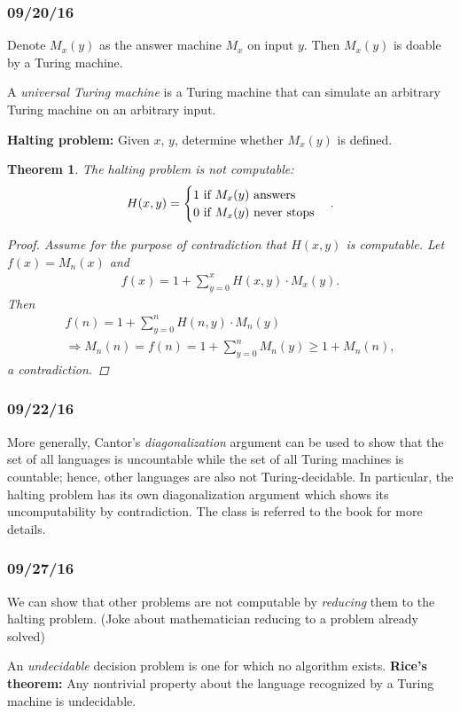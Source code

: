 \documentclass[a4paper,12pt]{article}
\newtheorem{theorem}{Theorem}
\theoremstyle{remark}
\theoremstyle{definition}
\begin{document}
\subsubsection*{09/20/16}
Denote $M_x(y)$ as the answer machine $M_x$ on input $y$. Then $M_x(y)$ is doable by a Turing machine. \par
A \emph{universal Turing machine} is a Turing machine that can simulate an arbitrary Turing machine on an arbitrary input. \par
\textbf{Halting problem:} Given $x$, $y$, determine whether $M_x(y)$ is defined.
\begin{theorem}
    The halting problem is not computable:
    \begin{align*}
        H(x, y) = \begin{cases}
            1 \textnormal{ if } M_x(y) \textnormal{ answers} \\
            0 \textnormal{ if } M_x(y) \textnormal{ never stops}
        \end{cases}.
    \end{align*}
    \begin{proof}
        Assume for the purpose of contradiction that $H(x, y)$ is computable. Let $f(x) = M_n(x)$ and
        \begin{align*}
            f(x) = 1 + \sum_{y = 0}^x H(x, y) \cdot M_x(y).
        \end{align*}
        Then
        \begin{gather*}
            f(n) = 1 + \sum_{y = 0}^n H(n, y) \cdot M_n(y) \\
            \Rightarrow M_n(n) = f(n) = 1 + \sum_{y = 0}^n M_n(y) \geq 1 + M_n(n),
        \end{gather*}
        a contradiction.
    \end{proof}
\end{theorem}
\subsubsection*{09/22/16}
More generally, Cantor's \emph{diagonalization} argument can be used to show that the set of all languages is uncountable while the set of all Turing machines is countable; hence, other languages are also not Turing-decidable. In particular, the halting problem has its own diagonalization argument which shows its uncomputability by contradiction. The class is referred to the book for more details.
\subsubsection*{09/27/16}
We can show that other problems are not computable by \emph{reducing} them to the halting problem. (Joke about mathematician reducing to a problem already solved) \par
An \emph{undecidable} decision problem is one for which no algorithm exists. \textbf{Rice's theorem:} Any nontrivial property about the language recognized by a Turing machine is undecidable.
\end{document}
